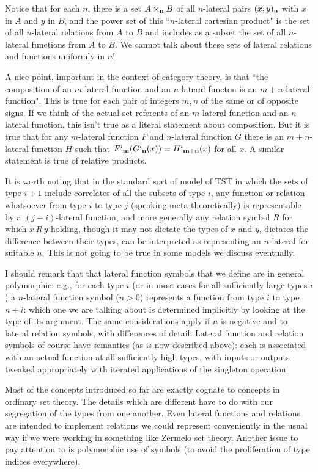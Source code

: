 \documentclass[12pt]{article}
\begin{document}
Notice that for each $n$, there is a set $A \times_{\bf n} B$ of all $n$-lateral pairs $(x,y)_{\bf n}$ with $x$ in $A$ and $y$  in $B$,
and the power set of this ``$n$-lateral cartesian product"  is  the  set of all $n$-lateral relations from $A$ to $B$ and includes as a subset the set of all $n$-lateral functions from $A$ to $B$.  We cannot talk about these sets of lateral relations and functions uniformly in $n$!

A nice point, important in the context of category theory, is that ``the composition of an $m$-lateral function and an $n$-lateral functon is an $m+n$-lateral function".   This is true for each pair of integers $m,n$ of the same or of opposite signs.  If we think of
the actual set referents of an $m$-lateral function and an $n$ lateral function, this isn't true as a literal statement about composition.  But it is true that for any $m$-lateral function
$F$ and $n$-lateral function $G$ there is an $m+n$-lateral function $H$ such that $F`_{\bf m}(G`_{\bf n}(x)) = H`_{\bf m+n}(x)$ for all $x$.  A similar statement is true of relative products.

It is worth noting that in the standard sort of model of TST in which the sets of type $i+1$ include correlates of all the subsets of type $i$, any function or relation whatsoever from 
type $i$ to type $j$ (speaking meta-theoretically) is representable by a $(j-i)$-lateral function, and more generally any relation symbol $R$ for which $x\,R\, y$ holding, though it may not dictate the types of $x$ and $y$, dictates the difference between their types, can be interpreted as representing an $n$-lateral for suitable $n$.   This is not going to be true in some models we discuss eventually.

I should remark that that lateral function symbols that we define are in general  polymorphic:  e.g., for each type $i$ (or in most cases for all sufficiently large types $i$) a $n$-lateral function symbol ($n>0$)
represents a function from type $i$ to type $n+i$:  which one we are talking about is determined implicitly by looking at the type of its argument.  The same considerations apply if $n$ is negative and to lateral relation symbols, with differences of detail.  Lateral function and relation symbols of course have semantics (as is now described above):  each is associated with an actual function
at all sufficiently high types, with inputs or outputs tweaked appropriately with iterated applications of the singleton operation.

Most of the concepts introduced so far are exactly cognate to concepts in ordinary set theory.  The details which are different have to do with our segregation of the types from one another.
Even lateral functions and relations are intended to implement relations we could represent conveniently in the usual way if we were working in something like Zermelo set theory.  Another issue to pay attention to is polymorphic use of symbols (to avoid the proliferation of type indices everywhere).
\end{document}
